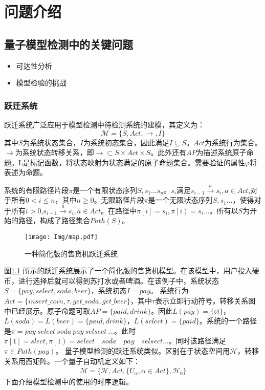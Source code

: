 \chapter{问题介绍}

\section{量子模型检测中的关键问题}
\begin{itemize}
  \item 可达性分析
  \item 模型检验的挑战
\end{itemize}
\subsection{跃迁系统}
跃迁系统广泛应用于模型检测中待检测系统的建模，其定义为\citep{baier2008principles}：
\begin{equation}
\mathcal{M}=\{S,Act,\rightarrow,I\}
\end{equation}
其中\(S\)为系统状态集合，\(I\)为系统初态集合，因此满足\(I\subseteq S\)。\(Act\)为系统行为集合。\(\rightarrow\)为系统状态转移关系，即\(\rightarrow\subset S\times Act\times S\)。此外还有\(AP\)为描述系统原子命题。L是标记函数，将状态映射为状态满足的原子命题集合。需要验证的属性\(\varphi\)将表述为命题。


系统的有限路径片段\(\pi\)是一个有限状态序列\(S,s_1\ldots s_n\)。\(s_i\)满足\(s_{i-1}\overset{a}{\rightarrow}s_i,a\in Act\),对于所有\(0<i\leq n\)，其中\(n\geq 0 \)。无限路径片段\(\pi\)是一个无限状态序列\(S,s_1\ldots\)，使得对于所有\(i>0\),\(s_{i-1} \overset{a}{\rightarrow}  s_i,a\in Act\)。在路径中\(\pi\left[i\right]=s_i,\pi\left[i\right)=s_i\ldots\)。所有以\(S\)为开始的路径，构成了路径集合\(Path\left(S\right)\)。

\begin{figure}[!htbp]
    \centering
    \texttt{[image: Img/map.pdf]}
    \caption{一种简化版的售货机跃迁系统}
    \label{fig:transition-system}
\end{figure}

图\ref{fig:transition-system} 所示的跃迁系统展示了一个简化版的售货机模型。在该模型中，用户投入硬币，进行选择后就可以得到苏打水或者啤酒。在该例子中，系统状态\(S=\{pay,select,soda,beer\}\)，系统初态\(I=pay\)。
系统行为\(Act=\{insert\_coin,\tau,get\_soda,get\_beer\}\)，其中\(\tau\)表示立即行动符号。转移关系图中已经展示。原子命题可取\(AP=\{paid,drink\}\)。因此\(L\left( pay \right)=\{\varnothing\}\)，\(L\left(soda\right)=L\left(beer\right)=\{paid,drink\}\)，\(L\left(select\right)=\{paid\}\)。系统的一个路径是\(\pi=pay\ select\ soda\ pay\ selsect\ \ldots\)。此时\(\pi\left[1\right]=slect,\pi\left[1\right)=select\quad soda\quad pay\quad selsect\ldots\)。同时该路径满足\(\pi\in Path\left(pay\right)\)。
量子模型检测的跃迁系统类似。区别在于状态空间用\(\mathcal{H}\)，转移关系用酉矩阵。一个量子自动机定义如下：
\begin{align}
    \mathcal{M}=\{\mathcal{H},Act,\{U_\alpha,\alpha\in Act\},\mathcal{H}_0\}
\end{align}
下面介绍模型检测中的使用的时序逻辑。

